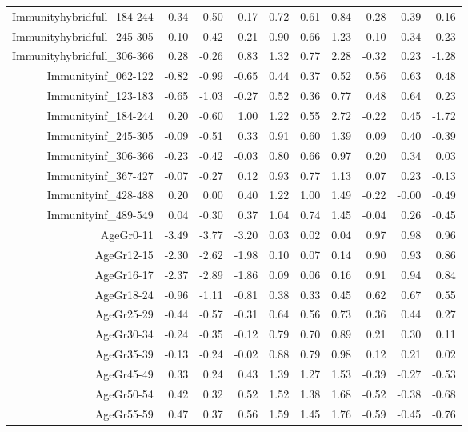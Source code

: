 \begin{table}[ht]
\begin{tabular}{rrrrrrrrrr}
  Immunityhybridfull\_184-244 & -0.34 & -0.50 & -0.17 & 0.72 & 0.61 & 0.84 & 0.28 & 0.39 & 0.16 \\ 
  Immunityhybridfull\_245-305 & -0.10 & -0.42 & 0.21 & 0.90 & 0.66 & 1.23 & 0.10 & 0.34 & -0.23 \\ 
  Immunityhybridfull\_306-366 & 0.28 & -0.26 & 0.83 & 1.32 & 0.77 & 2.28 & -0.32 & 0.23 & -1.28 \\ 
  Immunityinf\_062-122 & -0.82 & -0.99 & -0.65 & 0.44 & 0.37 & 0.52 & 0.56 & 0.63 & 0.48 \\ 
  Immunityinf\_123-183 & -0.65 & -1.03 & -0.27 & 0.52 & 0.36 & 0.77 & 0.48 & 0.64 & 0.23 \\ 
  Immunityinf\_184-244 & 0.20 & -0.60 & 1.00 & 1.22 & 0.55 & 2.72 & -0.22 & 0.45 & -1.72 \\ 
  Immunityinf\_245-305 & -0.09 & -0.51 & 0.33 & 0.91 & 0.60 & 1.39 & 0.09 & 0.40 & -0.39 \\ 
  Immunityinf\_306-366 & -0.23 & -0.42 & -0.03 & 0.80 & 0.66 & 0.97 & 0.20 & 0.34 & 0.03 \\ 
  Immunityinf\_367-427 & -0.07 & -0.27 & 0.12 & 0.93 & 0.77 & 1.13 & 0.07 & 0.23 & -0.13 \\ 
  Immunityinf\_428-488 & 0.20 & 0.00 & 0.40 & 1.22 & 1.00 & 1.49 & -0.22 & -0.00 & -0.49 \\ 
  Immunityinf\_489-549 & 0.04 & -0.30 & 0.37 & 1.04 & 0.74 & 1.45 & -0.04 & 0.26 & -0.45 \\ 
  AgeGr0-11 & -3.49 & -3.77 & -3.20 & 0.03 & 0.02 & 0.04 & 0.97 & 0.98 & 0.96 \\ 
  AgeGr12-15 & -2.30 & -2.62 & -1.98 & 0.10 & 0.07 & 0.14 & 0.90 & 0.93 & 0.86 \\ 
  AgeGr16-17 & -2.37 & -2.89 & -1.86 & 0.09 & 0.06 & 0.16 & 0.91 & 0.94 & 0.84 \\ 
  AgeGr18-24 & -0.96 & -1.11 & -0.81 & 0.38 & 0.33 & 0.45 & 0.62 & 0.67 & 0.55 \\ 
  AgeGr25-29 & -0.44 & -0.57 & -0.31 & 0.64 & 0.56 & 0.73 & 0.36 & 0.44 & 0.27 \\ 
  AgeGr30-34 & -0.24 & -0.35 & -0.12 & 0.79 & 0.70 & 0.89 & 0.21 & 0.30 & 0.11 \\ 
  AgeGr35-39 & -0.13 & -0.24 & -0.02 & 0.88 & 0.79 & 0.98 & 0.12 & 0.21 & 0.02 \\ 
  AgeGr45-49 & 0.33 & 0.24 & 0.43 & 1.39 & 1.27 & 1.53 & -0.39 & -0.27 & -0.53 \\ 
  AgeGr50-54 & 0.42 & 0.32 & 0.52 & 1.52 & 1.38 & 1.68 & -0.52 & -0.38 & -0.68 \\ 
  AgeGr55-59 & 0.47 & 0.37 & 0.56 & 1.59 & 1.45 & 1.76 & -0.59 & -0.45 & -0.76 \\ 

\end{tabular}
\end{table}
